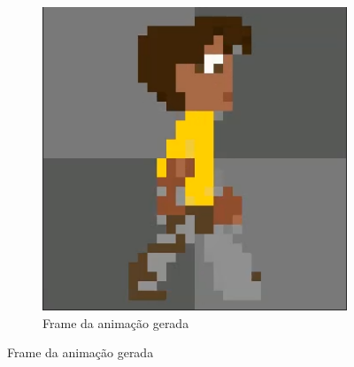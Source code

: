 \begin{figure}[htbp]
\begin{subfigure}{0.35\linewidth}
        \includegraphics[width=1\linewidth]{figs/pixelLab/dia4/print6.PNG}
        \caption{\small Frame da animação gerada}
        \label{fig:pixelLabAnimacao11b}
    \end{subfigure}
\end{figure}